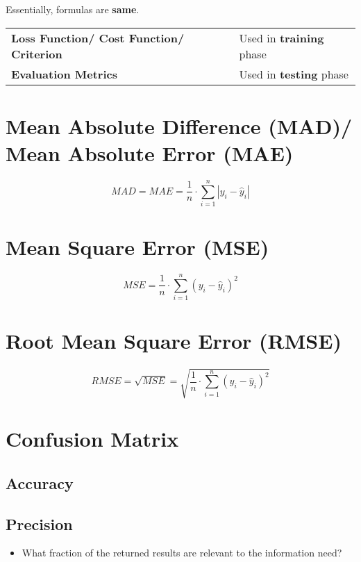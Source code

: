 Essentially, formulas are \textbf{same}.

\begin{table}[h]
    \begin{tabular}{l l}
        \textbf{Loss Function/ Cost Function/ Criterion} & Used in \textbf{training} phase \\
        
        \textbf{Evaluation Metrics} & Used in \textbf{testing} phase \\
    \end{tabular}
\end{table}


\section{Mean Absolute Difference (MAD)/ Mean Absolute Error (MAE)}\label{Mean Absolute Difference (MAD)}\label{Mean Absolute Error (MAE)}

\[
    MAD = MAE = \displaystyle\frac{1}{n} \cdot \sum_{i=1}^{n} \left| y_i - \hat{y}_i \right|
\]


\section{Mean Square Error (MSE)}\label{Mean Square Error (MSE)}
\[
    MSE = \displaystyle\frac{1}{n} \cdot \sum_{i=1}^{n} ( y_i - \hat{y}_i )^2
\]

\section{Root Mean Square Error (RMSE)}\label{Root Mean Square Error (RMSE)}
\[
    RMSE = \sqrt{MSE} = \displaystyle\sqrt{\frac{1}{n} \cdot \sum_{i=1}^{n} ( y_i - \hat{y}_i )^2}
\]


\section{Confusion Matrix}
\subsection{Accuracy}

\subsection{Precision}
\begin{itemize}
    \item What fraction of the returned results are relevant to the information need? \cite{ir-1}
\end{itemize}

